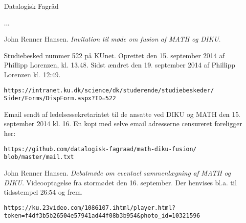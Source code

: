 \documentclass[a4paper]{article}
\begin{document}

\begin{flushright}

\footnotesize\sffamily\itshape

Datalogisk Fagråd

...



\end{flushright}

\begin{thebibliography}{9} %



John Renner Hansen. \emph{Invitation til møde om fusion af MATH og DIKU}.

Studiebesked nummer 522 på KUnet. Oprettet den 15. september 2014 af Phillipp
Lorenzen, kl. 13.48. Sidst ændret den 19. september 2014 af Phillipp Lorenzen
kl. 12:49.

\begin{lstlisting}
https://intranet.ku.dk/science/dk/studerende/studiebeskeder/
Sider/Forms/DispForm.aspx?ID=522
\end{lstlisting}

Email sendt af ledelsessekretariatet til de ansatte ved DIKU og MATH den 15.
september 2014 kl. 16. En kopi med selve email adresserne censureret foreligger
her:

\begin{lstlisting}
https://github.com/datalogisk-fagraad/math-diku-fusion/
blob/master/mail.txt
\end{lstlisting}



John Renner Hansen. \emph{Debatmøde om eventuel sammenlægning af MATH og DIKU}.
Videooptagelse fra stormødet den 16. september. Der henvises bl.a. til
tidsstempel 26:54 og frem.

\begin{lstlisting}
https://ku.23video.com/1086107.ihtml/player.html?
token=f4df3b5b26504e57941ad44f08b3b954&photo_id=10321596
\end{lstlisting}

\end{thebibliography}
\end{document}
